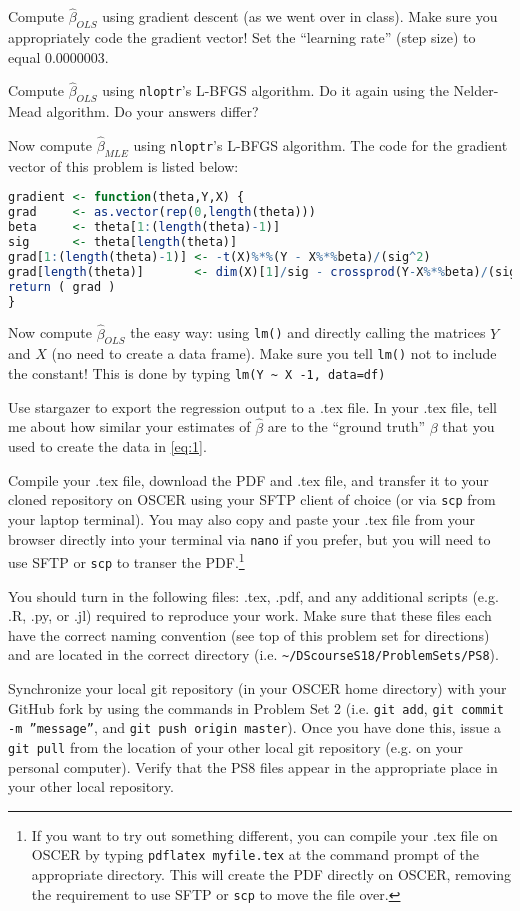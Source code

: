 \documentclass[12pt,english]{exam}
\begin{document}
\begin{questions}
\question Compute $\hat{\beta}_{OLS}$ using gradient descent (as we went over in class). Make sure you appropriately code the gradient vector! Set the ``learning rate'' (step size) to equal 0.0000003.

\question Compute $\hat{\beta}_{OLS}$ using \texttt{nloptr}'s L-BFGS algorithm. Do it again using the Nelder-Mead algorithm. Do your answers differ?

\question Now compute $\hat{\beta}_{MLE}$ using \texttt{nloptr}'s L-BFGS algorithm. The code for the gradient vector of this problem is listed below:
\begin{lstlisting}[language=R]
gradient <- function(theta,Y,X) {
grad     <- as.vector(rep(0,length(theta)))
beta     <- theta[1:(length(theta)-1)]
sig      <- theta[length(theta)]
grad[1:(length(theta)-1)] <- -t(X)%*%(Y - X%*%beta)/(sig^2)
grad[length(theta)]       <- dim(X)[1]/sig - crossprod(Y-X%*%beta)/(sig^3)
return ( grad )
}
\end{lstlisting}

\question Now compute $\hat{\beta}_{OLS}$ the easy way: using \texttt{lm()} and directly calling the matrices $Y$ and $X$ (no need to create a data frame). Make sure you tell \texttt{lm()} not to include the constant! This is done by typing \texttt{lm(Y \textasciitilde{} X -1, data=df)}

Use stargazer to export the regression output to a .tex file. In your .tex file, tell me about how similar your estimates of $\hat{\beta}$ are to the ``ground truth'' $\beta$ that you used to create the data in \eqref{eq:1}.

\question Compile your .tex file, download the PDF and .tex file, and transfer it to your cloned repository on OSCER using your SFTP client of choice (or via \texttt{scp} from your laptop terminal). You may also copy and paste your .tex file from your browser directly into your terminal via \texttt{nano} if you prefer, but you will need to use SFTP or \texttt{scp} to transer the PDF.\footnote{If you want to try out something different, you can compile your .tex file on OSCER by typing \texttt{pdflatex myfile.tex} at the command prompt of the appropriate directory. This will create the PDF directly on OSCER, removing the requirement to use SFTP or \texttt{scp} to move the file over.}

\question You should turn in the following files: .tex, .pdf, and any additional scripts (e.g. .R, .py, or .jl) required to reproduce your work.  Make sure that these files each have the correct naming convention (see top of this problem set for directions) and are located in the correct directory (i.e. \texttt{\textasciitilde/DScourseS18/ProblemSets/PS8}).

\question Synchronize your local git repository (in your OSCER home directory) with your GitHub fork by using the commands in Problem Set 2 (i.e. \texttt{git add}, \texttt{git commit -m ''message''}, and \texttt{git push origin master}). Once you have done this, issue a \texttt{git pull} from the location of your other local git repository (e.g. on your personal computer). Verify that the PS8 files appear in the appropriate place in your other local repository.

\end{questions}
\end{document}
